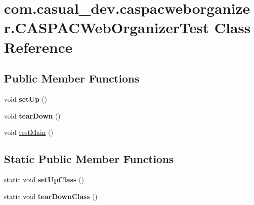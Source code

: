 \hypertarget{classcom_1_1casual__dev_1_1caspacweborganizer_1_1_c_a_s_p_a_c_web_organizer_test}{\section{com.\-casual\-\_\-dev.\-caspacweborganizer.\-C\-A\-S\-P\-A\-C\-Web\-Organizer\-Test Class Reference}
\label{classcom_1_1casual__dev_1_1caspacweborganizer_1_1_c_a_s_p_a_c_web_organizer_test}
}
\subsection*{Public Member Functions}
\begin{DoxyCompactItemize}
\item 
\hypertarget{classcom_1_1casual__dev_1_1caspacweborganizer_1_1_c_a_s_p_a_c_web_organizer_test_a9bc3ddd24a37132da2525fa422cbb6ec}{void {\bfseries set\-Up} ()}\label{classcom_1_1casual__dev_1_1caspacweborganizer_1_1_c_a_s_p_a_c_web_organizer_test_a9bc3ddd24a37132da2525fa422cbb6ec}

\item 
\hypertarget{classcom_1_1casual__dev_1_1caspacweborganizer_1_1_c_a_s_p_a_c_web_organizer_test_af3848530562455a005b9b000811be0f3}{void {\bfseries tear\-Down} ()}\label{classcom_1_1casual__dev_1_1caspacweborganizer_1_1_c_a_s_p_a_c_web_organizer_test_af3848530562455a005b9b000811be0f3}

\item 
void \hyperlink{classcom_1_1casual__dev_1_1caspacweborganizer_1_1_c_a_s_p_a_c_web_organizer_test_a560010a551eed2b0af48bb15c49e33b5}{test\-Main} ()
\end{DoxyCompactItemize}
\subsection*{Static Public Member Functions}
\begin{DoxyCompactItemize}
\item 
\hypertarget{classcom_1_1casual__dev_1_1caspacweborganizer_1_1_c_a_s_p_a_c_web_organizer_test_a570d771da64b0964de639b9705838d13}{static void {\bfseries set\-Up\-Class} ()}\label{classcom_1_1casual__dev_1_1caspacweborganizer_1_1_c_a_s_p_a_c_web_organizer_test_a570d771da64b0964de639b9705838d13}

\item 
\hypertarget{classcom_1_1casual__dev_1_1caspacweborganizer_1_1_c_a_s_p_a_c_web_organizer_test_a72e548136af4d663a5ced420bdf2e597}{static void {\bfseries tear\-Down\-Class} ()}\label{classcom_1_1casual__dev_1_1caspacweborganizer_1_1_c_a_s_p_a_c_web_organizer_test_a72e548136af4d663a5ced420bdf2e597}

\end{DoxyCompactItemize}


